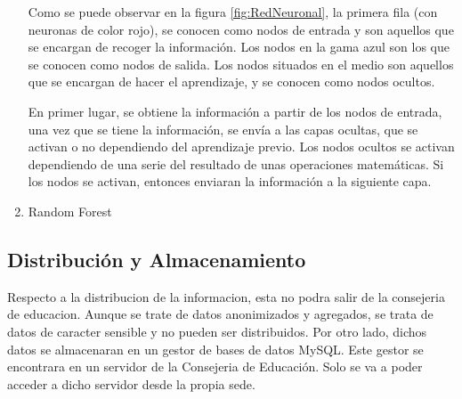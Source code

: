 \begin{enumerate}
Como se puede observar en la figura \ref{fig:RedNeuronal}, la primera fila (con neuronas de color rojo), se conocen como nodos de entrada y son aquellos que se encargan de recoger la información. Los nodos en la gama azul son los que se conocen como nodos de salida. Los nodos situados en el medio son aquellos que se encargan de hacer el aprendizaje, y se conocen como nodos ocultos.

En primer lugar, se obtiene la información a partir de los nodos de entrada, una vez que se tiene la información, se envía a las capas ocultas, que se activan o no dependiendo del aprendizaje previo. Los nodos ocultos se activan dependiendo de una serie del resultado de unas operaciones matemáticas. Si los nodos se activan, entonces enviaran la información a la siguiente capa.

\item Random Forest

\end{enumerate}

\subsection{Distribución y Almacenamiento}
Respecto a la distribucion de la informacion, esta no podra salir de la consejeria de educacion. Aunque se trate de datos anonimizados y agregados, se trata de datos de caracter sensible y no pueden ser distribuidos. Por otro lado, dichos datos se almacenaran en un gestor de bases de datos MySQL. Este gestor se encontrara en un servidor de la Consejeria de Educación. Solo se va a poder acceder a dicho servidor desde la propia sede.